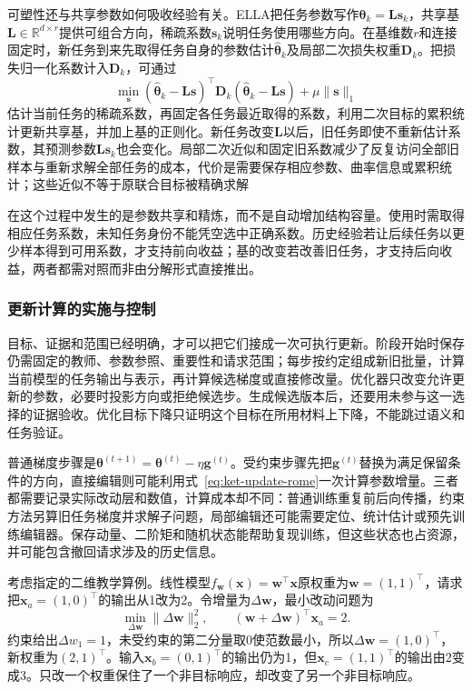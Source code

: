 可塑性还与共享参数如何吸收经验有关。ELLA把任务参数写作$\bm\theta_k=\bm L\bm s_k$，共享基$\bm L\in\mathbb R^{d\times r}$提供可组合方向，稀疏系数$\bm s_k$说明任务使用哪些方向。在基维数$r$和连接固定时，新任务到来先取得任务自身的参数估计$\hat{\bm\theta}_k$及局部二次损失权重$\bm D_k$。把损失归一化系数计入$\bm D_k$，可通过
\[
\min_{\bm s}
(\hat{\bm\theta}_k-\bm L\bm s)^\top
\bm D_k(\hat{\bm\theta}_k-\bm L\bm s)+\mu\lVert\bm s\rVert_1
\]
估计当前任务的稀疏系数，再固定各任务最近取得的系数，利用二次目标的累积统计更新共享基，并加上基的正则化。新任务改变$\bm L$以后，旧任务即使不重新估计系数，其预测参数$\bm L\bm s_k$也会变化。局部二次近似和固定旧系数减少了反复访问全部旧样本与重新求解全部任务的成本，代价是需要保存相应参数、曲率信息或累积统计；这些近似不等于原联合目标被精确求解

在这个过程中发生的是参数共享和精炼，而不是自动增加结构容量。使用时需取得相应任务系数，未知任务身份不能凭空选中正确系数。历史经验若让后续任务以更少样本得到可用系数，才支持前向收益；基的改变若改善旧任务，才支持后向收益，两者都需对照而非由分解形式直接推出。

\subsubsection{更新计算的实施与控制}
\label{sec:ket-update-computation}

目标、证据和范围已经明确，才可以把它们接成一次可执行更新。阶段开始时保存仍需固定的教师、参数参照、重要性和请求范围；每步按约定组成新旧批量，计算当前模型的任务输出与表示，再计算候选梯度或直接修改量。优化器只改变允许更新的参数，必要时投影方向或拒绝候选步。生成候选版本后，还要用未参与这一选择的证据验收。优化目标下降只证明这个目标在所用材料上下降，不能跳过语义和任务验证。

普通梯度步骤是$\bm\theta^{(t+1)}=\bm\theta^{(t)}-\eta\bm g^{(t)}$。受约束步骤先把$\bm g^{(t)}$替换为满足保留条件的方向，直接编辑则可能利用式~\eqref{eq:ket-update-rome}一次计算参数增量。三者都需要记录实际改动层和数值，计算成本却不同：普通训练重复前后向传播，约束方法另算旧任务梯度并求解子问题，局部编辑还可能需要定位、统计估计或预先训练编辑器。保存动量、二阶矩和随机状态能帮助复现训练，但这些状态也占资源，并可能包含撤回请求涉及的历史信息。

考虑指定的二维教学算例。线性模型$f_{\bm w}(\bm x)=\bm w^\top\bm x$原权重为$\bm w=(1,1)^\top$，请求把$\bm x_a=(1,0)^\top$的输出从1改为2。令增量为$\Delta\bm w$，最小改动问题为
\[
\min_{\Delta\bm w}\lVert\Delta\bm w\rVert_2^2,
\qquad
(\bm w+\Delta\bm w)^\top\bm x_a=2.
\]
约束给出$\Delta w_1=1$，未受约束的第二分量取0使范数最小，所以$\Delta\bm w=(1,0)^\top$，新权重为$(2,1)^\top$。输入$\bm x_b=(0,1)^\top$的输出仍为1，但$\bm x_c=(1,1)^\top$的输出由2变成3。只改一个权重保住了一个非目标响应，却改变了另一个非目标响应。

